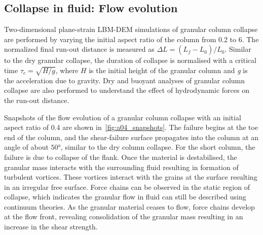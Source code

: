 \subsection{Collapse in fluid: Flow evolution}
\label{sec:collapse_fluid_evolution}
Two-dimensional plane-strain LBM-DEM simulations of granular column 
collapse are performed by varying the initial aspect ratio of the column from 
0.2 to 6. The normalized final run-out distance is measured as $\Delta L = 
(L_{\textit{f}}-L_{\textit{0}})/L_{\textit{0}}$. Similar to the dry granular 
collapse, the duration of collapse is normalised with a critical time $\tau_c 
= \sqrt{H/g}$, where $H$ is the initial height of the granular column and 
\textit{g} is the acceleration due to gravity. Dry and buoyant analyses of 
granular column collapse are also performed to understand the effect of 
hydrodynamic forces on the run-out distance.

Snapshots of the flow evolution of a granular column collapse with an initial 
aspect ratio of 0.4 are shown in~\cref{fig:a04_snapshots}. The failure begins 
at the toe end of the column, and the shear-failure surface propagates into the 
column at an angle of about $50\si{\degree}$, similar to the dry column 
collapse. For the short column, the failure is due to collapse of the flank. 
Once the material is destabilised, the granular mass interacts with the 
surrounding fluid resulting in formation of turbulent vortices. These vortices 
interact with the grains at the surface resulting in an irregular free surface. 
Force chains can be observed in the static region of collapse, which indicates 
the granular flow in fluid can still be described using continuum theories. As 
the granular material ceases to flow, force chains develop at the flow front, 
revealing consolidation of the granular mass resulting in an increase in the 
shear strength. 

